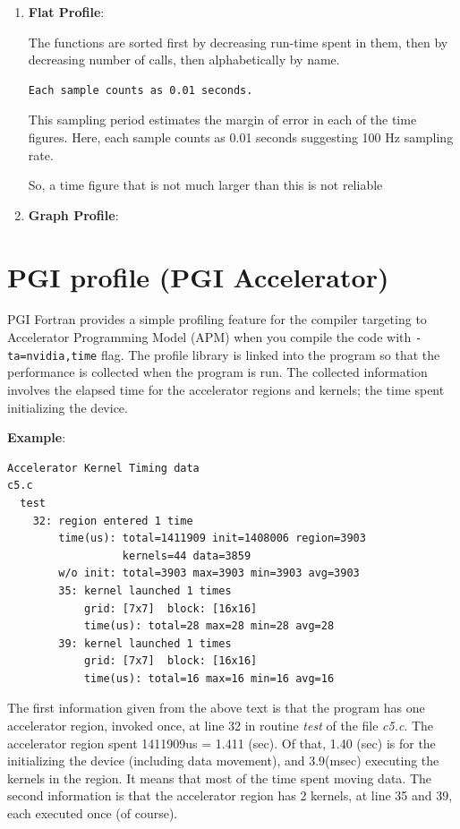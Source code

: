 \begin{enumerate}
  \item {\bf Flat Profile}:
  
  The functions are sorted first by decreasing run-time spent in them, then by
  decreasing number of calls, then alphabetically by name.
  
  \begin{verbatim}
Each sample counts as 0.01 seconds.  
  \end{verbatim}
  This sampling period estimates the margin of error in each of the time figures. 
  Here, each sample counts as 0.01 seconds suggesting  100 Hz sampling rate.
  
  So, a time figure that is not much larger than this is not reliable
  
  \item {\bf Graph Profile}:
  
  
  
\end{enumerate}




\section{PGI profile (PGI Accelerator)}
\label{sec:pgi-profile}

PGI Fortran provides a simple profiling feature for the compiler
targeting to Accelerator Programming Model (APM) when you compile the
code with \verb!-ta=nvidia,time! flag.  The profile library is linked
into the program so that the performance is collected when the program
is run. The collected information involves the elapsed time for the
accelerator regions and kernels; the time spent initializing the
device.

{\bf Example}:
\begin{verbatim}
Accelerator Kernel Timing data
c5.c
  test
    32: region entered 1 time
        time(us): total=1411909 init=1408006 region=3903
                  kernels=44 data=3859
        w/o init: total=3903 max=3903 min=3903 avg=3903
        35: kernel launched 1 times
            grid: [7x7]  block: [16x16]
            time(us): total=28 max=28 min=28 avg=28
        39: kernel launched 1 times
            grid: [7x7]  block: [16x16]
            time(us): total=16 max=16 min=16 avg=16
\end{verbatim}
The first information given from the above text is that the program
has one accelerator region, invoked once, at line 32 in routine
{\it test} of the file {\it c5.c}. The accelerator region spent
1411909us = 1.411 (sec). Of that, 1.40 (sec) is for the initializing
the device (including data movement), and 3.9(msec) executing the
kernels in the region. It means that most of the time spent moving
data.  The second information is that the accelerator region has 2
kernels, at line 35 and 39, each executed once (of course).

